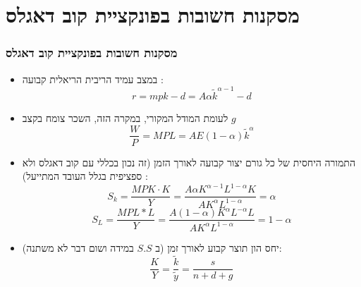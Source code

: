 \documentclass[usenames,dvipsnames]{beamer}
\begin{document}
\begin{RTL}
\begin{frame}[allowframebreaks]
\end{frame}

\section{מסקנות חשובות בפונקציית קוב דאגלס}

\begin{frame}[allowframebreaks]
    \frametitle{מסקנות חשובות בפונקציית קוב דאגלס}
    \begin{itemize}
        \item במצב עמיד הריבית הריאלית קבועה : 
        $$r = mpk - d = A\alpha \tilde{k} ^ {\alpha - 1 } - d $$
        \item לעומת המודל המקורי, במקרה הזה, השכר צומח בקצב $g$ $$\frac{W}{P} = MPL = A E \left(1 - \alpha \right) \tilde{k} ^ \alpha$$
        \item התמורה היחסית של כל גורם יצור קבועה לאורך הזמן (זה נכון בכללי עם קוב דאגלס ולא ספציפית בגלל העובד המתייעל) : $$S_k = \frac{MPK \cdot K}{Y } = \frac{A \alpha K^{\alpha - 1 } L ^{1 - \alpha} K }{A K^\alpha L^{1-\alpha}} = \alpha$$ $$
        {S}_L=\frac{M P L * L}{Y}=\frac{A(1-\alpha) K^\alpha L^{-\alpha} L}{A K^\alpha L^{1-\alpha}}=1-\alpha
        $$
        \item יחס הון תוצר קבוע לאורך זמן (ב $S.S$ במידה ושום דבר לא משתנה): $$\frac{K}{Y} = \frac{\tilde{k}}{\tilde{y}} = \frac{s}{n+d+g}$$
    \end{itemize}
    

\end{frame}

\end{RTL}
\end{document}
